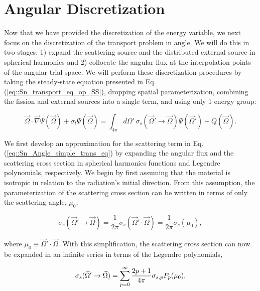 \section{Angular Discretization}
\label{sec::Sn_Angle}

Now that we have provided the discretization of the energy variable, we next focus on the discretization of the transport problem in angle. We will do this in two stages: 1) expand the scattering source and the distributed external source in spherical harmonics and 2) collocate the angular flux at the interpolation points of the angular trial space. We will perform these discretization procedures by taking the steady-state equation presented in Eq. (\ref{eq::Sn_transport_eq_op_SS}), dropping spatial parameterization, combining the fission and external sources into a single term, and using only 1 energy group:

\begin{equation}
\label{eq::Sn_Angle_simple_trans_eq}
\vec{\Omega} \cdot \vec{\nabla} \Psi (\vec{\Omega}) + \sigma_t \Psi (\vec{\Omega}) = \int_{4 \pi}  d\Omega' \, \sigma_s ( \vec{\Omega}' \rightarrow \vec{\Omega}) \Psi (\vec{\Omega}') + Q  (\vec{\Omega}) .
\end{equation}

We first develop an approximation for the scattering term in Eq. (\ref{eq::Sn_Angle_simple_trans_eq}) by expanding the angular flux and the scattering cross section in spherical harmonics functions and Legendre polynomials, respectively. We begin by first assuming that the material is isotropic in relation to the radiation's initial direction. From this assumption, the parameterization of the scattering cross section can be written in terms of only the scattering angle, $\mu_0$,

\begin{equation}
\label{eq::Sn_scatt_xs}
\sigma_s ( \vec{\Omega}' \rightarrow \vec{\Omega}) = \frac{1}{2 \pi} \sigma_s ( \vec{\Omega}' \cdot \vec{\Omega}) = \frac{1}{2 \pi} \sigma_s ( \mu_0) , 
\end{equation}

\noindent where $\mu_0 \equiv  \vec{\Omega}' \cdot \vec{\Omega}$. With this simplification, the scattering cross section can now be expanded in an infinite series in terms of the Legendre polynomials,

\begin{equation}
\label{eq::Sn_scatt_xs_legendre}
\sigma_s ( \vec{\Omega}' \rightarrow \vec{\Omega}) = \sum\displaylimits_{p=0}^{\infty} \frac{2p + 1}{4 \pi}  \sigma_{s,p} P_p ( \mu_0) , 
\end{equation}

